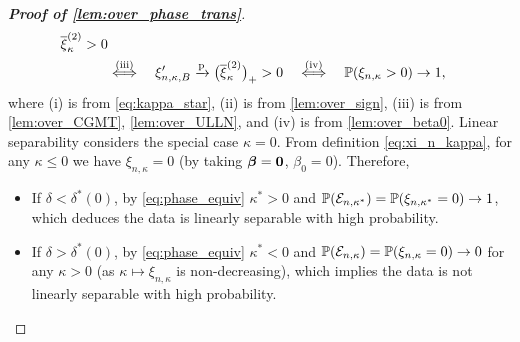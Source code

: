 \begin{proof}[\textbf{Proof of \cref{lem:over_phase_trans}}]
\begin{equation}
\begin{aligned}
        \bar\xi_{\kappa}^{(2)} > 0 
        \\
        & \overset{\mathmakebox[0pt][c]{\text{(iii)}}}{\Longleftrightarrow} \quad
        \xi'_{n, \kappa, B}  \conp \bigl( \bar\xi^{(2)}_{\kappa} \bigr)_+ > 0
        \quad \overset{\mathmakebox[0pt][c]{\text{(iv)}}}{\Longleftrightarrow} \quad
        \P(\xi_{n, \kappa} > 0) \to 1,
    \end{aligned}
\end{equation}
where (i) is from \cref{eq:kappa_star}, (ii) is from \cref{lem:over_sign}, (iii) is from \cref{lem:over_CGMT}, \ref{lem:over_ULLN}, and (iv) is from \cref{lem:over_beta0}. Linear separability considers the special case $\kappa = 0$. From definition \cref{eq:xi_n_kappa}, for any $\kappa \le 0$ we have $\xi_{n, \kappa} = 0$ (by taking $\vbeta = \bzero$, $\beta_0 = 0$). Therefore, 
\begin{itemize}
    \item If $\delta < \delta^*(0)$, by \cref{eq:phase_equiv} $\kappa^* > 0$ and $\P(\mathcal{E}_{n, \kappa^*}) = \P(\xi_{n, \kappa^*} = 0)
    \to 1$, which deduces the data is linearly separable with high probability.
    \item If $\delta > \delta^*(0)$, by \cref{eq:phase_equiv} $\kappa^* < 0$ and $\P(\mathcal{E}_{n, \kappa}) = \P(\xi_{n, \kappa} = 0)
    \to 0$ for any $\kappa > 0$ (as $\kappa \mapsto \xi_{n, \kappa}$ is non-decreasing), which implies the data is not linearly separable with high probability.
\end{itemize}
\end{proof}

